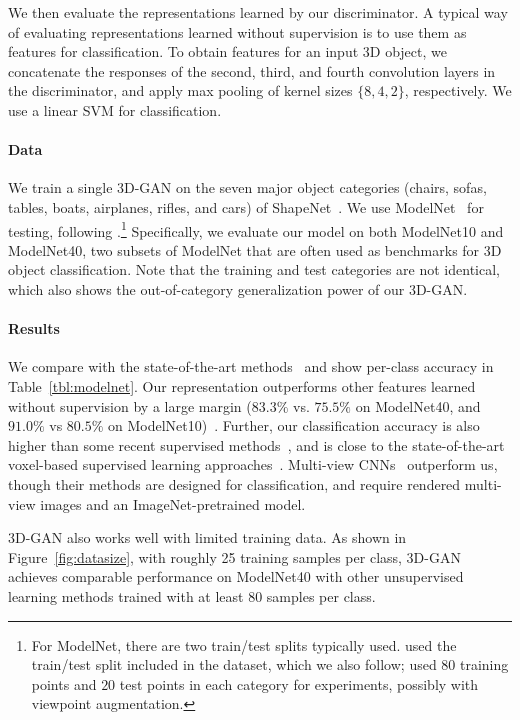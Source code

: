 \documentclass{article}
\newcommand{\fig}[1]{Figure~\ref{#1}}
\newcommand{\tbl}[1]{Table~\ref{#1}}
\newcommand{\model}{3D-GAN\xspace}
\newcommand{\myparagraph}[1]{\vspace{-10pt}\paragraph{#1}}
\begin{document}
We then evaluate the representations learned by our discriminator. A typical way of evaluating representations learned without supervision is to use them as features for classification. 
To obtain features for an input 3D object, we concatenate the responses of the second, third, and fourth convolution layers in the discriminator, and apply max pooling of kernel sizes $\{8, 4, 2\}$, respectively. We use a linear SVM for classification.

\myparagraph{Data} We train a single \model on the seven major object categories (chairs, sofas, tables, boats, airplanes, rifles, and cars) of ShapeNet~\citep{chang2015shapenet}. We use ModelNet~\citep{wu20153d} for testing, following \cite{sharma2016vconv,maturana2015voxnet,qi2016volumetric}.\footnote{For ModelNet, there are two train/test splits typically used. \cite{qi2016volumetric,shi2015deeppano,maturana2015voxnet} used the train/test split included in the dataset, which we also follow; \cite{wu20153d,su2015multi,sharma2016vconv} used $80$ training points and $20$ test points in each category for experiments, possibly with viewpoint augmentation.} Specifically, we evaluate our model on both ModelNet10 and ModelNet40, two subsets of ModelNet that are often used as benchmarks for 3D object classification. Note that the training and test categories are not identical, which also shows the out-of-category generalization power of our \model.

\myparagraph{Results} We compare with the state-of-the-art methods~\citep{wu20153d,girdhar2016learning,sharma2016vconv,sedaghat2016orientation} and show per-class accuracy in \tbl{tbl:modelnet}. Our representation outperforms other features learned without supervision by a large margin ($83.3\%$ vs. $75.5\%$ on ModelNet40, and $91.0\%$ vs $80.5\%$ on ModelNet10)~\citep{girdhar2016learning,sharma2016vconv}. Further, our classification accuracy is also higher than some recent supervised methods~\citep{shi2015deeppano}, and is close to the state-of-the-art voxel-based supervised learning approaches~\citep{maturana2015voxnet,sedaghat2016orientation}. Multi-view CNNs~\citep{su2015multi,qi2016volumetric} outperform us, though their methods are designed for classification, and require rendered multi-view images and an ImageNet-pretrained model.

\model also works well with limited training data. As shown in \fig{fig:datasize}, with roughly 25 training samples per class, \model achieves comparable performance on ModelNet40 with other unsupervised learning methods trained with at least 80 samples per class.
\end{document}
